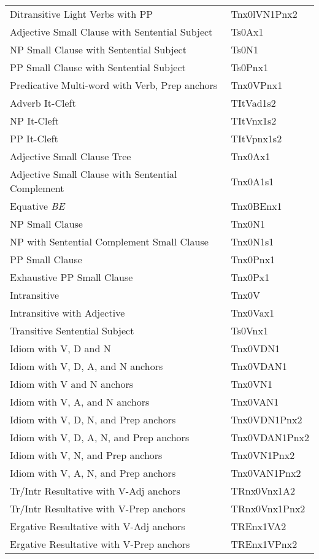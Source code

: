 \begin{tabular}{ll}
Ditransitive Light Verbs with PP & Tnx0lVN1Pnx2\\
Adjective Small Clause with Sentential Subject & Ts0Ax1\\
NP Small Clause with Sentential Subject &  Ts0N1\\
PP Small Clause with Sentential Subject & Ts0Pnx1\\
Predicative Multi-word with Verb, Prep anchors & Tnx0VPnx1\\
Adverb It-Cleft & TItVad1s2\\
NP It-Cleft & TItVnx1s2\\
PP It-Cleft & TItVpnx1s2\\
Adjective Small Clause Tree & Tnx0Ax1\\
Adjective Small Clause with Sentential Complement & Tnx0A1s1\\
Equative {\it BE} & Tnx0BEnx1\\
NP Small Clause & Tnx0N1\\
NP with Sentential Complement Small Clause & Tnx0N1s1\\
PP Small Clause & Tnx0Pnx1\\
Exhaustive PP Small Clause & Tnx0Px1\\
Intransitive & Tnx0V\\
Intransitive with Adjective & Tnx0Vax1\\
Transitive Sentential Subject &  Ts0Vnx1\\
Idiom with V, D and N & Tnx0VDN1\\
Idiom with V, D, A, and N anchors & Tnx0VDAN1\\
Idiom with V and N anchors & Tnx0VN1\\
Idiom with V, A, and N anchors & Tnx0VAN1\\
Idiom with V, D, N, and Prep anchors & Tnx0VDN1Pnx2\\
Idiom with V, D, A, N, and Prep anchors & Tnx0VDAN1Pnx2\\
Idiom with V, N, and Prep anchors & Tnx0VN1Pnx2\\
Idiom with V, A, N, and Prep anchors & Tnx0VAN1Pnx2\\
Tr/Intr Resultative with V-Adj anchors & TRnx0Vnx1A2\\
Tr/Intr Resultative with V-Prep anchors & TRnx0Vnx1Pnx2\\
Ergative Resultative with V-Adj anchors & TREnx1VA2\\
Ergative Resultative with V-Prep anchors & TREnx1VPnx2\\
\end{tabular}
\normalsize

\clearpage















